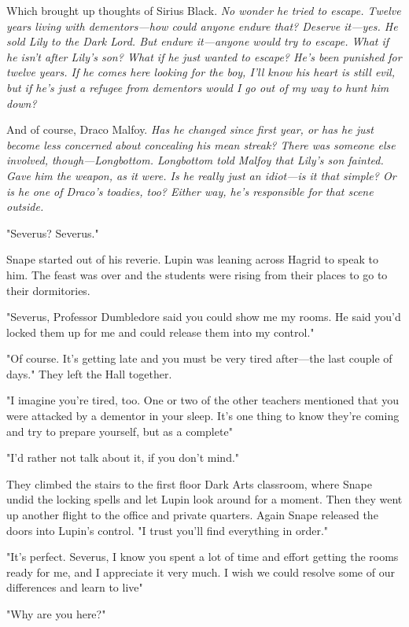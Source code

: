 Which brought up thoughts of Sirius Black. \emph{No wonder he tried to escape. Twelve years living with dementors—how could anyone endure that? Deserve it—yes. He sold Lily to the Dark Lord. But endure it—anyone would try to escape. What if he isn't after Lily's son? What if he just wanted to escape? He's been punished for twelve years. If he comes here looking for the boy, I'll know his heart is still evil, but if he's just a refugee from dementors would I go out of my way to hunt him down?}

And of course, Draco Malfoy. \emph{Has he changed since first year, or has he just become less concerned about concealing his mean streak? There was someone else involved, though—Longbottom. Longbottom told Malfoy that Lily's son fainted. Gave him the weapon, as it were. Is he really just an idiot—is it that simple? Or is he one of Draco's toadies, too? Either way, he's responsible for that scene outside.}

"Severus? Severus."

Snape started out of his reverie. Lupin was leaning across Hagrid to speak to him. The feast was over and the students were rising from their places to go to their dormitories.

"Severus, Professor Dumbledore said you could show me my rooms. He said you'd locked them up for me and could release them into my control."

"Of course. It's getting late and you must be very tired after—the last couple of days." They left the Hall together.

"I imagine you're tired, too. One or two of the other teachers mentioned that you were attacked by a dementor in your sleep. It's one thing to know they're coming and try to prepare yourself, but as a complete{\el}"

"I'd rather not talk about it, if you don't mind."

They climbed the stairs to the first floor Dark Arts classroom, where Snape undid the locking spells and let Lupin look around for a moment. Then they went up another flight to the office and private quarters. Again Snape released the doors into Lupin's control. "I trust you'll find everything in order."

"It's perfect. Severus, I know you spent a lot of time and effort getting the rooms ready for me, and I appreciate it very much. I wish we could resolve some of our differences and learn to live{\el}"

"Why are you here?"

